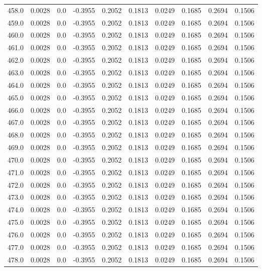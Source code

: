 \begin{longtable}{lrrrrrrrrr}
458.0 & 0.0028 & 0.0 & -0.3955 & 0.2052 & 0.1813 & 0.0249 & 0.1685 & 0.2694 & 0.1506 \\
459.0 & 0.0028 & 0.0 & -0.3955 & 0.2052 & 0.1813 & 0.0249 & 0.1685 & 0.2694 & 0.1506 \\
460.0 & 0.0028 & 0.0 & -0.3955 & 0.2052 & 0.1813 & 0.0249 & 0.1685 & 0.2694 & 0.1506 \\
461.0 & 0.0028 & 0.0 & -0.3955 & 0.2052 & 0.1813 & 0.0249 & 0.1685 & 0.2694 & 0.1506 \\
462.0 & 0.0028 & 0.0 & -0.3955 & 0.2052 & 0.1813 & 0.0249 & 0.1685 & 0.2694 & 0.1506 \\
463.0 & 0.0028 & 0.0 & -0.3955 & 0.2052 & 0.1813 & 0.0249 & 0.1685 & 0.2694 & 0.1506 \\
464.0 & 0.0028 & 0.0 & -0.3955 & 0.2052 & 0.1813 & 0.0249 & 0.1685 & 0.2694 & 0.1506 \\
465.0 & 0.0028 & 0.0 & -0.3955 & 0.2052 & 0.1813 & 0.0249 & 0.1685 & 0.2694 & 0.1506 \\
466.0 & 0.0028 & 0.0 & -0.3955 & 0.2052 & 0.1813 & 0.0249 & 0.1685 & 0.2694 & 0.1506 \\
467.0 & 0.0028 & 0.0 & -0.3955 & 0.2052 & 0.1813 & 0.0249 & 0.1685 & 0.2694 & 0.1506 \\
468.0 & 0.0028 & 0.0 & -0.3955 & 0.2052 & 0.1813 & 0.0249 & 0.1685 & 0.2694 & 0.1506 \\
469.0 & 0.0028 & 0.0 & -0.3955 & 0.2052 & 0.1813 & 0.0249 & 0.1685 & 0.2694 & 0.1506 \\
470.0 & 0.0028 & 0.0 & -0.3955 & 0.2052 & 0.1813 & 0.0249 & 0.1685 & 0.2694 & 0.1506 \\
471.0 & 0.0028 & 0.0 & -0.3955 & 0.2052 & 0.1813 & 0.0249 & 0.1685 & 0.2694 & 0.1506 \\
472.0 & 0.0028 & 0.0 & -0.3955 & 0.2052 & 0.1813 & 0.0249 & 0.1685 & 0.2694 & 0.1506 \\
473.0 & 0.0028 & 0.0 & -0.3955 & 0.2052 & 0.1813 & 0.0249 & 0.1685 & 0.2694 & 0.1506 \\
474.0 & 0.0028 & 0.0 & -0.3955 & 0.2052 & 0.1813 & 0.0249 & 0.1685 & 0.2694 & 0.1506 \\
475.0 & 0.0028 & 0.0 & -0.3955 & 0.2052 & 0.1813 & 0.0249 & 0.1685 & 0.2694 & 0.1506 \\
476.0 & 0.0028 & 0.0 & -0.3955 & 0.2052 & 0.1813 & 0.0249 & 0.1685 & 0.2694 & 0.1506 \\
477.0 & 0.0028 & 0.0 & -0.3955 & 0.2052 & 0.1813 & 0.0249 & 0.1685 & 0.2694 & 0.1506 \\
478.0 & 0.0028 & 0.0 & -0.3955 & 0.2052 & 0.1813 & 0.0249 & 0.1685 & 0.2694 & 0.1506 \\

\end{longtable}
